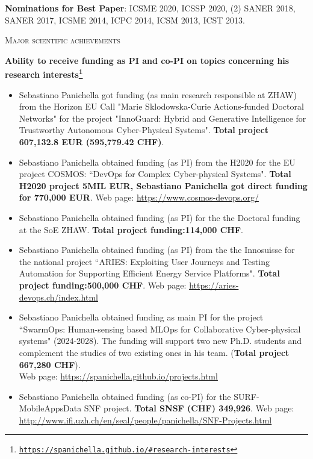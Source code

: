 \documentclass[11pt]{article}
\newcommand{\ra}{$\rightarrow$}
\newcommand{\chg}[2]{\textcolor{red}{\sout{#1}}{\ra}\textcolor{blue}{\uline{#2}}} %
\newcommand{\chg}[2]{#2}
\providecommand*\url[1]{\href{#1}{#1}}
\renewcommand*\url[1]{\href{#1}{\texttt{#1}}}
\begin{document}

\textbf{Nominations for Best Paper}: ICSME 2020, ICSSP 2020, (2) SANER 2018, SANER 2017, ICSME 2014, ICPC 2014, ICSM 2013, ICST 2013.

\medskip \medskip


\textsc{\fontsize{14}{12}\selectfont Major scientific achievements}

\textbf{Ability to receive funding as PI and co-PI on topics concerning his research interests\footnote{\url{https://spanichella.github.io/\#research-interests}}}
\vspace{-2.5mm}
\begin{itemize}
  \item Sebastiano Panichella got funding (as main research responsible at ZHAW) from the Horizon EU Call "Marie Sklodowska-Curie Actions-funded Doctoral Networks" for the project "InnoGuard: Hybrid and Generative Intelligence for Trustworthy Autonomous Cyber-Physical Systems".
\textbf{Total project 607,132.8 EUR (595,779.42 CHF)}. 
  \item Sebastiano Panichella obtained funding  (as PI) from the H2020 for the EU project COSMOS: ``DevOps for Complex Cyber-physical Systems". \textbf{Total H2020 project 5MIL EUR, Sebastiano Panichella got direct funding for 770,000 EUR}. Web page: \href{https://www.cosmos-devops.org/}{https://www.cosmos-devops.org/}
  \vspace{-2mm}
   \item Sebastiano Panichella obtained funding  (as PI) for the the Doctoral funding at the SoE ZHAW. \textbf{Total project funding:\textbf{114,000 CHF}}.
    \vspace{-2mm}
  \item Sebastiano Panichella obtained funding  (as PI) from the the Innosuisse for the national project ``ARIES: Exploiting User Journeys and Testing Automation for Supporting Efficient Energy Service Platforms". \textbf{Total project funding:\textbf{500,000 CHF}}. Web page: \href{https://aries-devops.ch/index.html}{https://aries-devops.ch/index.html}
    \vspace{-2mm}
\item Sebastiano Panichella obtained funding as main PI for
   the project ``SwarmOps: Human-sensing based MLOps for Collaborative Cyber-physical systems" (2024-2028). The funding will support two new Ph.D. students and complement the studies of two existing ones in his team. (\textbf{Total project 667,280 CHF}). \\Web page: \href{https://spanichella.github.io/projects.html}{https://spanichella.github.io/projects.html}
      \vspace{-2mm}
  \item Sebastiano Panichella obtained funding  (as co-PI) for
   the SURF-MobileAppsData SNF project. \textbf{Total SNSF (CHF) 349,926}. Web page: \href{http://www.ifi.uzh.ch/en/seal/people/panichella/SNF-Projects.html}{http://www.ifi.uzh.ch/en/seal/people/panichella/SNF-Projects.html}
\vspace{-2mm}
\end{itemize}
\end{document}

